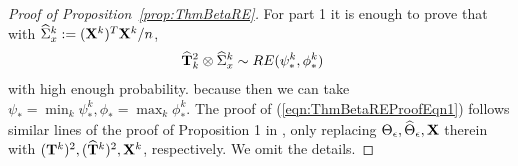 \documentclass[12pt, letterpaper]{article}
\numberwithin{equation}{section}
\begin{document}
\begin{proof}[Proof of Proposition~\ref{prop:ThmBetaRE}]
For part 1 it is enough to prove that with $ \widehat \Sigma_x^k := ({\mathbf{X}}^k)^T {\mathbf{X}}^k/n$,
%
\begin{align}\label{eqn:ThmBetaREProofEqn1}
\widehat {{\mathbf{T}}}_k^2 \otimes \widehat \Sigma_x^k & \sim RE (\psi_*^k, \phi_*^k)
\end{align}
%
with high enough probability. because then we can take $\psi_* = \min_k \psi_*^k, \phi_* = \max_k \phi_*^k$. The proof of (\ref{eqn:ThmBetaREProofEqn1}) follows similar lines of the proof of Proposition 1 in \cite{LinEtal16}, only replacing $\Theta_\epsilon, \widehat \Theta_\epsilon, {\mathbf{X}}$ therein with $({\mathbf{T}}^k)^2, (\widehat {{\mathbf{T}}}^k)^2, {\mathbf{X}}^k$, respectively. We omit the details.%
%

\end{proof}
\end{document}
